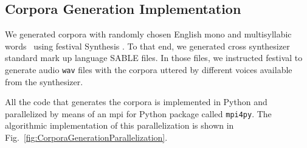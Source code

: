 \documentclass[10pt,journal,compsoc]{IEEEtran}
\begin{document}















\subsection{Corpora Generation Implementation}
\label{CorpGenImp}

We generated corpora with randomly chosen English mono and multisyllabic words~\cite{Dematties2018} using \gls{festival} Synthesis \cite{festival2014}. To that end, we generated cross synthesizer standard mark up language SABLE \cite{sable} files. In those files, we instructed \gls{festival} to generate audio \texttt{wav} files with the corpora uttered by different voices available from the synthesizer.

All the code that generates the corpora is implemented in Python and parallelized by means of an \gls{mpi} for Python package called \texttt{mpi4py}. The algorithmic implementation of this parallelization is shown in Fig.~\ref{fig:CorporaGenerationParallelization}.

\end{document}

